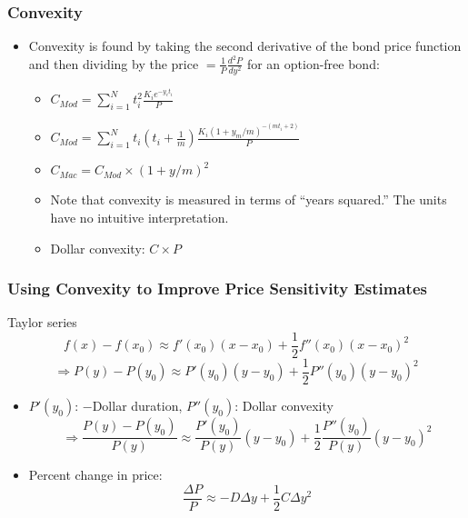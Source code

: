 \documentclass[10pt]{beamer}
\begin{document}
\begin{frame}
	\frametitle{Convexity}
	
	
	\begin{itemize} \itemsep10pt
		\item Convexity is found by taking the second derivative of the bond price function and then dividing by the price $= \frac{1}{P} \frac{d^2 P}{d y^2}$ for an option-free bond:
		\begin{itemize}
			\item $C_{Mod} =\sum_{i=1}^{N} t_i^2  \frac{ K_i  e^{-y_c t_i}}{P}$
			
			\item $C_{Mod} = \sum_{i=1}^{N} t_i \left( t_i + \frac{1}{m} \right)\frac{K_i \left( 1+ y_m/m \right)^{-(mt_i+2)}}{P} $ \vspace{10pt}
			
			
			\item $C_{Mac} = C_{Mod} \times (1+y/m)^2	$
	
			\item Note that convexity is measured in terms of ``years squared.'' The units 	have no intuitive interpretation.
			\item Dollar convexity: $C \times P$
		\end{itemize}
		
		
	\end{itemize}
	
\end{frame}




\begin{frame}
	\frametitle{Using Convexity to Improve Price Sensitivity Estimates}
	
	\begin{block}{Taylor series}
		$$
		f(x)-f(x_0) \approx f'(x_0)(x-x_0) + \frac{1}{2}f''(x_0)(x-x_0)^2
		$$
		$$
		\Rightarrow P(y)-P(y_0) \approx P'(y_0)(y-y_0) + \frac{1}{2}P''(y_0)(y-y_0)^2
		$$
	\end{block}
	
	\begin{itemize} \itemsep10pt
		\item $P'(y_0)$: $-$Dollar duration, $P''(y_0)$: Dollar convexity
		$$
		\Rightarrow \frac{P(y)-P(y_0)}{P(y)}  \approx \frac{P'(y_0)}{P(y)}(y-y_0) + \frac{1}{2}\frac{P''(y_0)}{P(y)}(y-y_0)^2
		$$
		\item Percent change in price:
		$$
		\frac{\Delta P}{P} \approx -D \Delta y + \frac{1}{2} C \Delta y^2 
		$$
	\end{itemize}
	
\end{frame}
\end{document}
